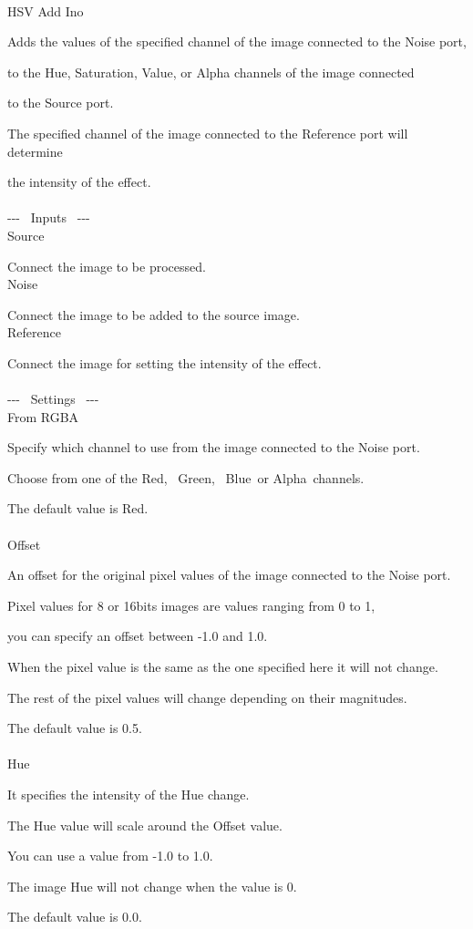 \documentclass[a4paper,12pt]{article}
\begin{document}
\thispagestyle{empty}

\Large
\noindent \\
HSV Add Ino\medskip
\par
\normalsize
Adds the values of the specified channel of the image connected to the Noise port,\par 
to the Hue, Saturation, Value, or Alpha channels of the image connected\par
to the Source port.\\
\par
The specified channel of the image connected to the Reference port will determine\par
the intensity of the effect.\\
\\
-{-}- \ Inputs \ -{-}-\\
Source\par
Connect the image to be processed.\\
Noise\par
Connect the image to be added to the source image.\\
Reference\par
Connect the image for setting the intensity of the effect.\\
\\
-{-}- \ Settings \ -{-}-\\
From RGBA\par
Specify which channel to use from the image connected to the Noise port.\par
Choose from one of the \textquotedbl Red\textquotedbl, \ \textquotedbl Green\textquotedbl, \ \textquotedbl Blue\textquotedbl  \ or \textquotedbl Alpha\textquotedbl \ channels.\par
The default value is \textquotedbl Red\textquotedbl .\\
\\
Offset\par
An offset for the original pixel values of the image connected to the Noise port.\par
Pixel values for 8 or 16bits images are values ranging from 0 to 1,\par
you can specify an offset between -1.0 and 1.0.\par
When the pixel value is the same as the one specified here it will not change.\par
The rest of the pixel values will change depending on their magnitudes.\par
The default value is 0.5.\\
\\
Hue\par
It specifies the intensity of the Hue change.\par
The Hue value will scale around the Offset value.\par
You can use a value from -1.0 to 1.0.\par
The image Hue will not change when the value is 0.\par
The default value is 0.0.\\
\newpage
\end{document}
